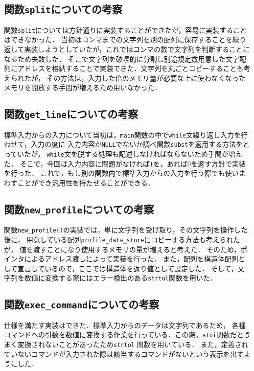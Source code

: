 \documentclass[a4j,11pt]{jarticle}
\begin{document}
\subsection{関数\texttt{split}についての考察}

関数\verb|split|については方針通りに実装することができたが，容易に実装することはできなかった．
当初はコンマまでの文字列を別の配列に保存することを繰り返して実装しようとしていたが，これではコンマの数で文字列を判断することになるため失敗した．
そこで文字列を破壊的に分割し別途規定数用意した文字配列にアドレスを格納することで実装できた．文字列を丸ごとコピーすることも考えられたが，
その方法は，入力した倍のメモリ量が必要な上に使わなくなったメモリを開放する手間が増えるため用いなかった．

\subsection{関数\texttt{get\_line}についての考察}
標準入力からの入力について当初は，\verb|main|関数の中で\verb|while|文繰り返し入力を行わせて，入力の度に
入力内容が\verb|NULL|でないか調べ関数\verb|subst|を適用する方法をとっていたが，
\verb|while|文を脱する処理も記述しなければならないため手間が増えた．
そこで，今回は入力内容に問題がなければ$1$を，あれば$0$を返す方針で実装を行った．
これで，もし別の関数内で標準入力からの入力を行う際でも使いまわすことができ汎用性を持たせることができる．

\subsection{関数\texttt{new\_profile}についての考察}
関数\verb|new_profile()|の実装では，単に文字列を受け取り，その文字列を操作した後に，
用意している配列\verb|profile_data_store|にコピーする方法も考えられたが，
値を渡すことになり使用するメモリの量が増えると考えた．
そのため，ポインタによるアドレス渡しによって実装を行った．
また，配列を構造体配列として宣言しているので，ここでは構造体を返り値として設定した．
そして，文字列を数値に変換する際にはエラー検出のある\verb|strtol|関数を用いた．
\subsection{関数\texttt{exec\_command}についての考察}
仕様を満たす実装はできた．標準入力からのデータは文字列であるため，
各種コマンドへの引数を数値に変換する作業を行っている．この際，\verb|atoi|関数だとうまく変換されないことがあったため\verb|strtol|
関数を用いている．
また，定義されていないコマンドが入力された際は該当するコマンドがないという表示を出すようにした．
\end{document}
